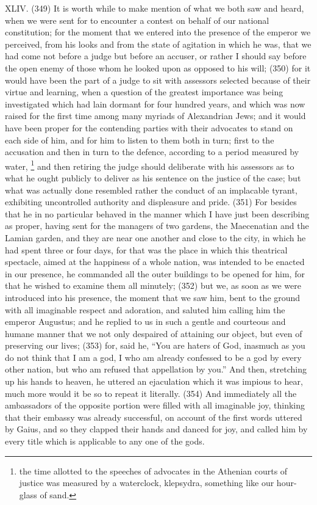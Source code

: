 XLIV. (349) It is worth while to make mention of what we both saw and heard, when we were sent
for to encounter a contest on behalf of our national constitution; for the moment that we entered
into the presence of the emperor we perceived, from his looks and from the state of agitation in
which he was, that we had come not before a judge but before an accuser, or rather I should say
before the open enemy of those whom he looked upon as opposed to his will; (350) for it would
have been the part of a judge to sit with assessors selected because of their virtue and learning,
when a question of the greatest importance was being investigated which had lain dormant for four
hundred years, and which was now raised for the first time among many myriads of Alexandrian
Jews; and it would have been proper for the contending parties with their advocates to stand on
each side of him, and for him to listen to them both in turn; first to the accusation and then in turn to
the defence, according to a period measured by water, \footnote{the time allotted to the speeches of advocates in
the Athenian courts of justice was measured by a waterclock, klepsydra, something like our hour-glass of sand.} and
then retiring the judge should deliberate with his assessors as to what he ought publicly to deliver
as his sentence on the justice of the case; but what was actually done resembled rather the
conduct of an implacable tyrant, exhibiting uncontrolled authority and displeasure and pride. (351)
For besides that he in no particular behaved in the manner which I have just been describing as
proper, having sent for the managers of two gardens, the Maecenatian and the Lamian garden,
and they are near one another and close to the city, in which he had spent three or four days, for
that was the place in which this theatrical spectacle, aimed at the happiness of a whole nation, was
intended to be enacted in our presence, he commanded all the outer buildings to be opened for
him, for that he wished to examine them all minutely; (352) but we, as soon as we were introduced
into his presence, the moment that we saw him, bent to the ground with all imaginable respect and
adoration, and saluted him calling him the emperor Augustus; and he replied to us in such a gentle
and courteous and humane manner that we not only despaired of attaining our object, but even of
preserving our lives; (353) for, said he, ``You are haters of God, inasmuch as you do not think that I
am a god, I who am already confessed to be a god by every other nation, but who am refused that
appellation by you.'' And then, stretching up his hands to heaven, he uttered an ejaculation which it
was impious to hear, much more would it be so to repeat it literally. (354) And immediately all the
ambassadors of the opposite portion were filled with all imaginable joy, thinking that their embassy
was already successful, on account of the first words uttered by Gaius, and so they clapped their
hands and danced for joy, and called him by every title which is applicable to any one of the gods.

